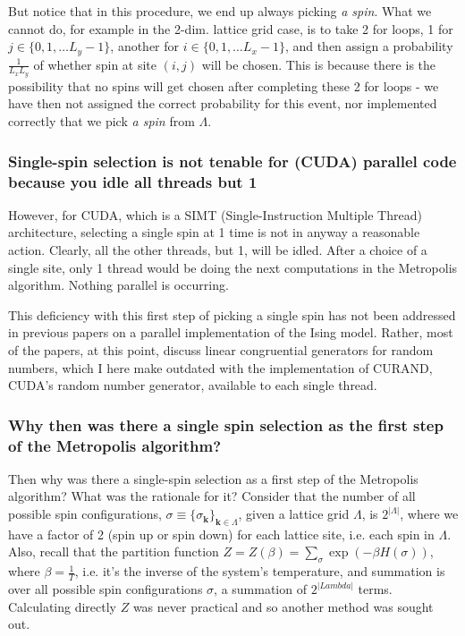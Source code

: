 \documentclass[10pt]{amsart}
\begin{document}
\begin{multicols*}{2}
But notice that in this procedure, we end up always picking \emph{a spin}.  What we cannot do, for example in the 2-dim. lattice grid case, is to take 2 for loops, 1 for $j \in \lbrace 0 ,1,\dots L_y-1 \rbrace$, another for $i\in \lbrace 0 ,1,\dots L_x-1 \rbrace$, and then assign a probability $\frac{1}{L_xL_y}$ of whether spin at site $(i,j)$ will be chosen.  This is because there is the possibility that no spins will get chosen after completing these 2 for loops - we have then not assigned the correct probability for this event, nor implemented correctly that we pick \emph{a spin} from $\Lambda$.  

\subsubsection{Single-spin selection is not tenable for (CUDA) parallel code because you idle all threads but 1}  

However, for CUDA, which is a SIMT (Single-Instruction Multiple Thread) architecture, selecting a single spin at 1 time is not in anyway a reasonable action.  Clearly, all the other threads, but 1, will be idled.  After a choice of a single site, only 1 thread would be doing the next computations in the Metropolis algorithm.  Nothing parallel is occurring.  

This deficiency with this first step of picking a single spin has not been addressed in previous papers on a parallel implementation of the Ising model.  Rather, most of the papers, at this point, discuss linear congruential generators for random numbers, which I here make outdated with the implementation of CURAND, CUDA's random number generator, available to each single thread.  

\subsubsection{Why then was there a single spin selection as the first step of the Metropolis algorithm?}  

Then why was there a single-spin selection as a first step of the Metropolis algorithm?  What was the rationale for it?  Consider that the number of all possible spin configurations, $\sigma \equiv \lbrace \sigma_{\mathbf{k}} \rbrace_{\mathbf{k} \in \Lambda}$, given a lattice grid $\Lambda$, is $2^{|\Lambda|}$, where we have a factor of 2 (spin up or spin down) for each lattice site, i.e. each spin in $\Lambda$.  Also, recall that the partition function $Z= Z(\beta) = \sum_{ \sigma } \exp{ (-\beta H(\sigma) )}$, where $\beta = \frac{1}{T}$, i.e. it's the inverse of the system's temperature, and summation is over all possible spin configurations $\sigma$, a summation of $2^{|Lambda|}$ terms.  Calculating directly $Z$ was never practical and so another method was sought out.  


\end{multicols*}
\end{document}
